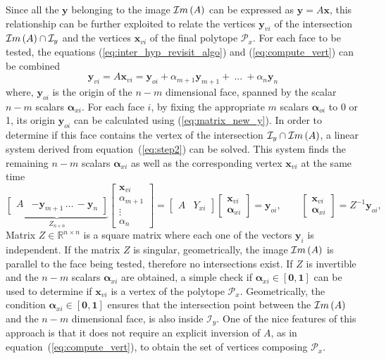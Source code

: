 Since all the $\bm{y}$ belonging to the image $\mathcal{I}m\left(A\right)$ can be expressed as $\bm{y}=A\bm{x}$, this relationship can be further exploited to relate the vertices $\bm{y}_{vi}$ of the intersection $\mathcal{I}m\left(A\right)\cap\mathcal{I}_y$ and the vertices $\bm{x}_{vi}$ of the final polytope $\mathcal{P}_x$. For each face to be tested, the equations  (\ref{eq:inter_hyp_revisit_algo}) and (\ref{eq:compute_vert}) can be combined
\begin{equation}
    \bm{y}_{vi} = A \bm{x}_{vi} = \bm{y}_{oi} + \alpha_{m+1} \bm{y}_{m+1}+ ~...~ + \alpha_n \bm{y}_n \label{eq:step2}
\end{equation}
where, $\bm{y}_{oi}$ is the origin of the $n\!-\!m$ dimensional face, spanned by the scalar $n\!-\!m$ scalars $\bm{\alpha}_{xi}$. For each face $i$, by fixing the appropriate $m$ scalars $\bm{\alpha}_{oi}$ to 0 or 1, its origin $\bm{y}_{oi}$ can be calculated using (\ref{eq:matrix_new_y}). In order to determine if this face contains the vertex of the intersection $\mathcal{I}_y\cap\mathcal{I}m\left(A\right)$, a linear system derived from equation~(\ref{eq:step2}) can be solved. This system finds the remaining $n\!-\!m$ scalars $\bm{\alpha}_{xi}$ as well as the corresponding vertex $\bm{x}_{vi}$ at the same time
\begin{equation}
    \underbrace{\begin{bmatrix}A&-\bm{y}_{m+1} \, \dots \, -\bm{y}_{n} \end{bmatrix}}_{Z_{n\times n}} \begin{bmatrix}\bm{x}_{vi}\\ \alpha_{m+1} \\ \vdots\\\alpha_{n} \end{bmatrix} =\begin{bmatrix}A &Y_{xi} \end{bmatrix}\begin{bmatrix}\bm{x}_{vi}\\ \bm{\alpha}_{xi} \end{bmatrix}  = \bm{y}_{oi}, \qquad \begin{bmatrix}\bm{x}_{vi}\\ \bm{\alpha}_{xi} \end{bmatrix} = Z^{-1}\bm{y}_{oi}, 
    \label{eq:linear_system_full}
\end{equation}
Matrix $Z\in\mathbb{R}^{n\times n}$ is a square matrix where each one of the vectors $\bm{y}_i$ is independent. If the matrix $Z$ is singular, geometrically, the image $\mathcal{I}m\left(A\right)$ is parallel to the face being tested, therefore no intersections exist. If $Z$ is invertible and the $n-m$ scalars $\bm{\alpha}_{xi}$ are obtained, a simple check if $\bm{\alpha}_{xi} \in [\bm{0},\bm{1}]$ can be used to determine if $\bm{x}_{vi}$ is a vertex of the polytope $\mathcal{P}_x$. Geometrically, the condition $\bm{\alpha}_{xi} \in [\bm{0},\bm{1}]$ ensures that the intersection point between the $\mathcal{I}m\left(A\right)$ and the $n\!-\!m$ dimensional face, is also inside $\mathcal{I}_y$. One of the nice features of this approach is that it does not require an explicit inversion of $A$, as in equation~(\ref{eq:compute_vert}), to obtain the set of vertices composing $\mathcal{P}_x$.

